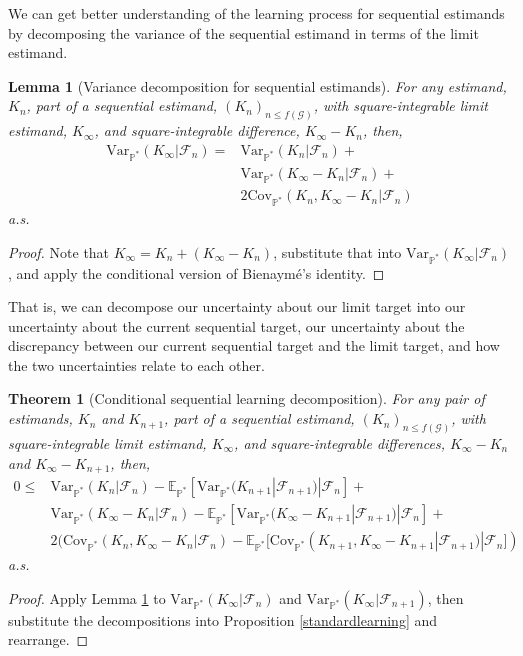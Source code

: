 \documentclass{article}
\newcommand{\Var}{\mathrm{Var}_{\mathbb{P}^*} }
\newcommand{\Cov}{\mathrm{Cov}_{\mathbb{P}^*} }
\newtheorem{theorem}{Theorem}
\newtheorem{lemma}{Lemma}
\begin{document}
 We can get better understanding of the learning process for sequential estimands by decomposing the variance of the sequential estimand in terms of the limit estimand.

\begin{lemma}[Variance decomposition for sequential estimands]
\label{vardecomp}
For any estimand, $K_n$, part of a sequential estimand, $(K_n)_{n\leq f(\mathcal{G})}$, with square-integrable limit estimand, $K_\infty$, and square-integrable difference, $K_\infty-K_n$, then,
\begin{align*}
\Var(K_\infty|\mathcal{F}_n)=&
\Var(K_n|\mathcal{F}_n)+\\
&\Var(K_\infty-K_n|\mathcal{F}_n)+\\
&2\Cov(K_n,K_\infty-K_n|\mathcal{F}_n)
\end{align*}
a.s.
\end{lemma}
\begin{proof}
    Note that $K_\infty=K_n+(K_\infty-K_n)$, substitute that into $\Var(K_\infty|\mathcal{F}_n)$, and apply the conditional version of Bienaymé's identity. 
\end{proof}

That is, we can decompose our uncertainty about our limit target into our uncertainty about the current sequential target, our uncertainty about the discrepancy between our current sequential target and the limit target, and how the two uncertainties relate to each other. 

\begin{theorem}[Conditional sequential learning decomposition]
\label{sequentiallearningdecomp}
For any pair of estimands, $K_n$ and $K_{n+1}$, part of a sequential estimand, $(K_n)_{n\leq f(\mathcal{G})}$, with square-integrable limit estimand, $K_\infty$, and square-integrable differences, $K_\infty-K_n$ and $K_\infty-K_{n+1}$, then,
\begin{align*}
    0\leq&\Var(K_{n}|\mathcal{F}_{n})-\mathbb{E}_{\mathbb{P}^*}[\Var(K_{n+1}|\mathcal{F}_{n+1})|\mathcal{F}_{n}]+\\
    &\Var(K_\infty-K_{n}|\mathcal{F}_{n})-\mathbb{E}_{\mathbb{P}^*}[\Var(K_\infty-K_{n+1}|\mathcal{F}_{n+1})|\mathcal{F}_{n}]+\\
    &2(\Cov(K_n,K_\infty-K_n|\mathcal{F}_n)-\mathbb{E}_{\mathbb{P}^*}[\Cov(K_{n+1},K_\infty-K_{n+1}|\mathcal{F}_{n+1})|\mathcal{F}_{n}])
\end{align*} a.s.
\end{theorem}
\begin{proof}
    Apply Lemma \ref{vardecomp} to $\Var(K_\infty|\mathcal{F}_n)$ and $\Var(K_\infty|\mathcal{F}_{n+1})$, then substitute the decompositions into Proposition \ref{standardlearning} and rearrange.
\end{proof}
\end{document}
